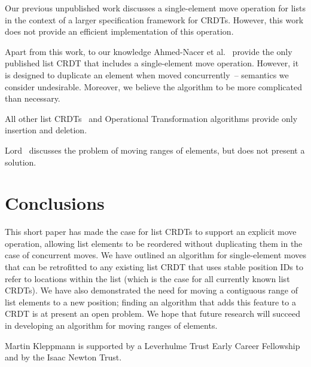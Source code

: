 \documentclass[sigplan,10pt]{acmart}
\begin{document}
Our previous unpublished work \cite{ExtendedVersion} discusses a single-element move operation for lists in the context of a larger specification framework for CRDTs.
However, this work does not provide an efficient implementation of this operation.

Apart from this work, to our knowledge Ahmed-Nacer et al.~\cite{AhmedNacer:2013eq} provide the only published list CRDT that includes a single-element move operation.
However, it is designed to duplicate an element when moved concurrently~-- semantics we consider undesirable.
Moreover, we believe the algorithm to be more complicated than necessary.

All other list CRDTs~\cite{Oster:2006wj,Preguica:2009fz,Roh:2011dw,Grishchenko:2014eh,Attiya:2016kh,Weiss:2009ht,Weiss:2010hx,Nedelec:2013ky,Nedelec:2016eo} and Operational Transformation algorithms \cite{Ellis:1989ue,Nichols:1995fd,Ressel:1996wx,Sun:1998vf,Oster:2006tr} provide only insertion and deletion.

Lord~\cite{Lord:2019bo} discusses the problem of moving ranges of elements, but does not present a solution.

\section{Conclusions}

This short paper has made the case for list CRDTs to support an explicit move operation, allowing list elements to be reordered without duplicating them in the case of concurrent moves.
We have outlined an algorithm for single-element moves that can be retrofitted to any existing list CRDT that uses stable position IDs to refer to locations within the list (which is the case for all currently known list CRDTs).
We have also demonstrated the need for moving a contiguous range of list elements to a new position; finding an algorithm that adds this feature to a CRDT is at present an open problem.
We hope that future research will succeed in developing an algorithm for moving ranges of elements.

\begin{acks}
Martin Kleppmann is supported by a Leverhulme Trust Early Career Fellowship and by the Isaac Newton Trust.
\end{acks}

\balance

{}
\end{document}
